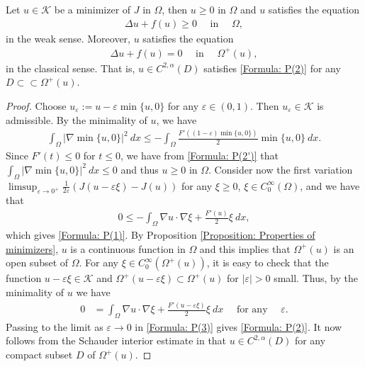 \documentclass[11pt,reqno]{amsart}
\begin{document}
\begin{proposition}\label{Proposition: Properties of minimizers}
	Let $u\in\mathcal{K}$ be a minimizer of $J$ in $\Omega$, then $u\geqslant0$ in $\Omega$ and $u$ satisfies the equation
	\begin{align}\label{Formula: P(1)}
		\Delta u+f(u)\geqslant0\quad\text{ in }\quad\Omega,
	\end{align}
    in the weak sense. Moreover, $u$ satisfies the equation
    \begin{align}\label{Formula: P(2)}
    	\Delta u+f(u)=0\quad\text{ in }\quad\varOmega^{+}(u),
    \end{align}
    in the classical sense. That is, $u\in C^{2,\alpha}(D)$ satisfies \eqref{Formula: P(2)} for any $D\subset\subset\varOmega^{+}(u)$.
\end{proposition}
\begin{proof}
	Choose $u_{\varepsilon}:=u-\varepsilon\min\{u,0\}$ for any $\varepsilon\in(0,1)$. Then $u_{\varepsilon}\in\mathcal{K}$ is admissible. By the minimality of $u$, we have
	\begin{align}\label{Formula: P(2')}
		\int_{\Omega}|\nabla\min\{u,0\}|^{2}\:dx\leqslant-\int_{\Omega}\frac{F'((1-\varepsilon)\min\{u,0\})}{2}\min\{u,0\}\:dx.
	\end{align}
    Since $F'(t)\leqslant0$ for $t\leqslant0$, we have from \eqref{Formula: P(2')} that $\int_{\Omega}|\nabla\min\{u,0\}|^{2}\:dx\leqslant0$ and thus $u\geqslant0$ in $\Omega$. Consider now the first variation $\limsup_{\varepsilon\to0^{+}}\frac{1}{2\varepsilon}(J(u-\varepsilon\xi)-J(u))$ for any $\xi\geqslant0$, $\xi\in C_{0}^{\infty}(\Omega)$, and we have that
    \begin{align*}
    	0\leqslant-\int_{\Omega}\nabla u\cdot\nabla\xi+\frac{F'(u)}{2}\xi\:dx,
    \end{align*}
    which gives \eqref{Formula: P(1)}. By Proposition \ref{Proposition: Properties of minimizers}, $u$ is a continuous function in $\Omega$ and this implies that $\varOmega^{+}(u)$ is an open subset of $\Omega$. For any $\xi\in C_{0}^{\infty}(\varOmega^{+}(u))$, it is easy to check that the function $u-\varepsilon\xi\in\mathcal{K}$ and $\varOmega^{+}(u-\varepsilon\xi)\subset\varOmega^{+}(u)$ for $|\varepsilon|>0$ small. Thus, by the minimality of $u$ we have
    \begin{align}\label{Formula: P(3)}
    	0&=\int_{\Omega}\nabla u\cdot\nabla\xi+\frac{F'(u-\varepsilon\xi)}{2}\xi\:dx\quad\text{ for any }\quad\varepsilon.
    \end{align}
    Passing to the limit as $\varepsilon\to0$ in \eqref{Formula: P(3)} gives \eqref{Formula: P(2)}. It now follows from the Schauder interior estimate in \cite{GT1998} that $u\in C^{2,\alpha}(D)$ for any compact subset $D$ of $\varOmega^{+}(u)$.
\end{proof}
\end{document}
